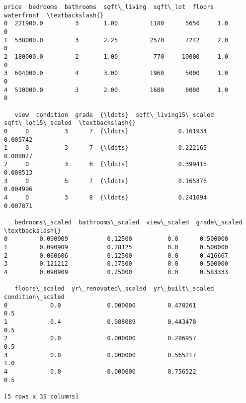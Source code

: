 \documentclass[11pt]{report}
\makeatletter
\newcommand{\boxspacing}{\kern\kvtcb@left@rule\kern\kvtcb@boxsep}
\newcommand{\prompt}[4]{
        {\ttfamily\llap{{\color{#2}[#3]:\hspace{3pt}#4}}\vspace{-\baselineskip}}
    }
\makeatother
\begin{document}
            \begin{tcolorbox}[breakable, size=fbox, boxrule=.5pt, pad at break*=1mm, opacityfill=0]
\prompt{Out}{outcolor}{16}{\boxspacing}
\begin{Verbatim}[commandchars=\\\{\}]
      price  bedrooms  bathrooms  sqft\_living  sqft\_lot  floors  waterfront  \textbackslash{}
0  221900.0         3       1.00         1180      5650     1.0           0
1  538000.0         3       2.25         2570      7242     2.0           0
2  180000.0         2       1.00          770     10000     1.0           0
3  604000.0         4       3.00         1960      5000     1.0           0
4  510000.0         3       2.00         1680      8080     1.0           0

   view  condition  grade  {\ldots}  sqft\_living15\_scaled  sqft\_lot15\_scaled  \textbackslash{}
0     0          3      7  {\ldots}              0.161934           0.005742
1     0          3      7  {\ldots}              0.222165           0.008027
2     0          3      6  {\ldots}              0.399415           0.008513
3     0          5      7  {\ldots}              0.165376           0.004996
4     0          3      8  {\ldots}              0.241094           0.007871

   bedrooms\_scaled  bathrooms\_scaled  view\_scaled  grade\_scaled  \textbackslash{}
0         0.090909           0.12500          0.0      0.500000
1         0.090909           0.28125          0.0      0.500000
2         0.060606           0.12500          0.0      0.416667
3         0.121212           0.37500          0.0      0.500000
4         0.090909           0.25000          0.0      0.583333

   floors\_scaled  yr\_renovated\_scaled  yr\_built\_scaled  condition\_scaled
0            0.0             0.000000         0.478261               0.5
1            0.4             0.988089         0.443478               0.5
2            0.0             0.000000         0.286957               0.5
3            0.0             0.000000         0.565217               1.0
4            0.0             0.000000         0.756522               0.5

[5 rows x 35 columns]
\end{Verbatim}
\end{tcolorbox}
        
\end{document}
